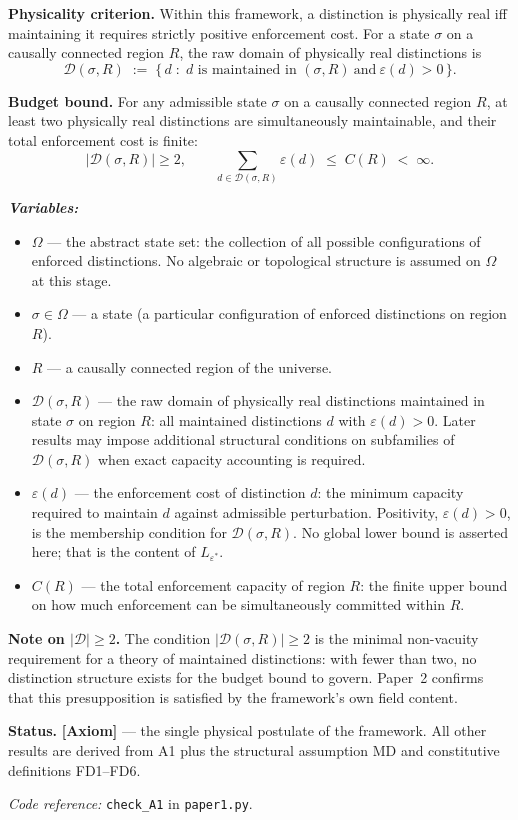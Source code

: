 \documentclass[11pt]{article}
\theoremstyle{remark}
\newenvironment{varlist}{\begin{itemize}[nosep,leftmargin=2em]}{\end{itemize}}
\newcommand{\coderef}[2]{\smallskip\noindent\textit{Code reference:} \texttt{#1} in \texttt{#2}.}
\begin{document}
\begin{tcolorbox}[apfbox, title={Axiom A1 (Finite Enforcement Capacity)}]
\textbf{Physicality criterion.}
Within this framework, a distinction is physically real iff maintaining it requires strictly positive enforcement cost.  For a state $\sigma$ on a causally connected region $R$, the raw domain of physically real distinctions is
\[
\mathcal{D}(\sigma,R)
\;:=\;
\{\, d \;:\; d \text{ is maintained in } (\sigma,R)\ \text{and}\ \varepsilon(d)>0 \,\}.
\]

\textbf{Budget bound.}
For any admissible state $\sigma$ on a causally connected region $R$, at least two physically real distinctions are simultaneously maintainable, and their total enforcement cost is finite:
\[
|\mathcal{D}(\sigma,R)| \ge 2,
\qquad
\sum_{d \in \mathcal{D}(\sigma,R)} \varepsilon(d)
\;\le\;
C(R)
\;<\;
\infty.
\]

\smallskip\noindent\textbf{\textit{Variables:}}
\begin{varlist}
\item $\Omega$ --- the abstract state set: the collection of all possible configurations of enforced distinctions.  No algebraic or topological structure is assumed on $\Omega$ at this stage.
\item $\sigma \in \Omega$ --- a state (a particular configuration of enforced distinctions on region $R$).
\item $R$ --- a causally connected region of the universe.
\item $\mathcal{D}(\sigma,R)$ --- the raw domain of physically real distinctions maintained in state $\sigma$ on region $R$: all maintained distinctions $d$ with $\varepsilon(d)>0$.  Later results may impose additional structural conditions on subfamilies of $\mathcal{D}(\sigma,R)$ when exact capacity accounting is required.
\item $\varepsilon(d)$ --- the enforcement cost of distinction $d$: the minimum capacity required to maintain $d$ against admissible perturbation.  Positivity, $\varepsilon(d)>0$, is the membership condition for $\mathcal{D}(\sigma,R)$.  No global lower bound is asserted here; that is the content of $L_{\varepsilon^*}$.
\item $C(R)$ --- the total enforcement capacity of region $R$: the finite upper bound on how much enforcement can be simultaneously committed within $R$.
\end{varlist}

\smallskip\noindent\textbf{Note on $|\mathcal{D}| \ge 2$.}
The condition $|\mathcal{D}(\sigma,R)| \ge 2$ is the minimal non-vacuity requirement for a theory of maintained distinctions: with fewer than two, no distinction structure exists for the budget bound to govern.  Paper~2 confirms that this presupposition is satisfied by the framework's own field content.

\smallskip\noindent\textbf{Status.}  \textbf{[Axiom]} --- the single physical postulate of the framework.  All other results are derived from A1 plus the structural assumption MD and constitutive definitions FD1--FD6.

\coderef{check\_A1}{paper1.py}
\end{tcolorbox}
\end{document}
